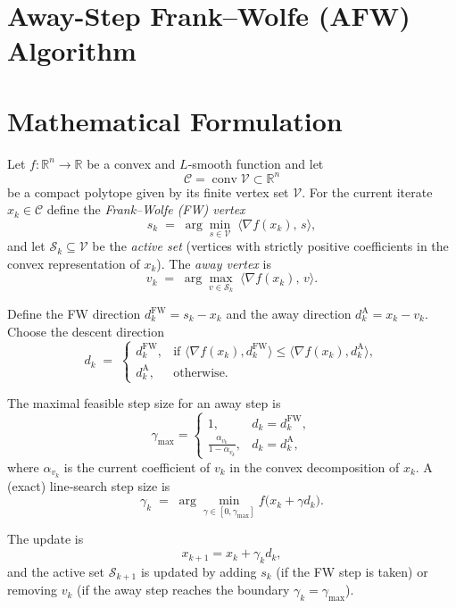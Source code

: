 \documentclass{article}
\begin{document}
\section*{Away-Step Frank–Wolfe (AFW) Algorithm}

\section*{Mathematical Formulation}
Let $f:\mathbb{R}^n\rightarrow\mathbb{R}$ be a convex and $L$‑smooth function and let 
\[
\mathcal{C}=\operatorname{conv}\mathcal{V}\subset\mathbb{R}^n
\]
be a compact polytope given by its finite vertex set $\mathcal{V}$.  
For the current iterate $x_k\in\mathcal{C}$ define the \emph{Frank–Wolfe (FW) vertex}
\[
s_k \;=\;\arg\min_{s\in\mathcal{V}}\;\langle\nabla f(x_k),\,s\rangle,
\tag{1}
\]
and let $\mathcal{S}_k\subseteq\mathcal{V}$ be the \emph{active set} (vertices with strictly positive
coefficients in the convex representation of $x_k$).  
The \emph{away vertex} is
\[
v_k \;=\;\arg\max_{v\in\mathcal{S}_k}\;\langle\nabla f(x_k),\,v\rangle .
\tag{2}
\]

Define the FW direction $d_k^{\text{FW}}=s_k-x_k$ and the away direction $d_k^{\text{A}}=x_k-v_k$.
Choose the descent direction
\[
d_k \;=\;
\begin{cases}
d_k^{\text{FW}}, & \text{if } \langle\nabla f(x_k),d_k^{\text{FW}}\rangle\le
\langle\nabla f(x_k),d_k^{\text{A}}\rangle,\\[4pt]
d_k^{\text{A}}, & \text{otherwise.}
\end{cases}
\tag{3}
\]

The maximal feasible step size for an away step is
\[
\gamma_{\max}= 
\begin{cases}
1, & d_k=d_k^{\text{FW}},\\[4pt]
\displaystyle\frac{\alpha_{v_k}}{1-\alpha_{v_k}}, & d_k=d_k^{\text{A}},
\end{cases}
\tag{4}
\]
where $\alpha_{v_k}$ is the current coefficient of $v_k$ in the convex decomposition of $x_k$.
A (exact) line‑search step size is
\[
\gamma_k \;=\; \arg\min_{\gamma\in[0,\gamma_{\max}]} f\bigl(x_k+\gamma d_k\bigr).
\tag{5}
\]

The update is
\[
x_{k+1}=x_k+\gamma_k d_k,
\tag{6}
\]
and the active set $\mathcal{S}_{k+1}$ is updated by adding $s_k$ (if the FW step is taken) or
removing $v_k$ (if the away step reaches the boundary $\gamma_k=\gamma_{\max}$).
\end{document}
